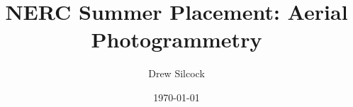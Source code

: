 \documentclass[singlecolumn]{revtex4}
\begin{document}
\title{NERC Summer Placement: Aerial Photogrammetry}
\author{Drew Silcock}
\date{\today}

\maketitle







\end{document}
